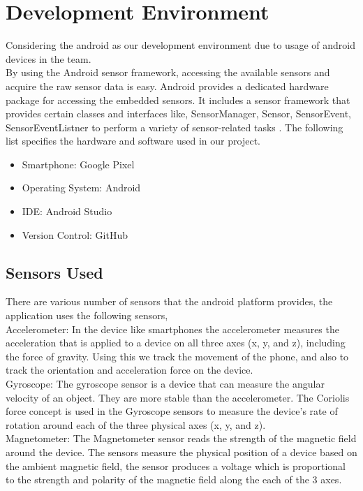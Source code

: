 \documentclass[conference]{IEEEtran}
\begin{document}
\section{Development Environment}
Considering the android as our development environment due to usage of android devices in the team.\\
By using the Android sensor framework, accessing the available sensors and acquire the raw sensor data is easy. Android provides a dedicated hardware package for accessing the embedded sensors. It includes a sensor framework that provides certain classes and interfaces like, SensorManager, Sensor, SensorEvent, SensorEventListner to perform a variety of sensor-related tasks \cite{b1}. The following list specifies the hardware and software used in our project.
\begin{itemize}
    \item Smartphone: Google Pixel
    \item Operating System: Android
    \item IDE: Android Studio
    \item Version Control: GitHub
\end{itemize}

\subsection{Sensors Used}
There are various number of sensors that the android platform provides, the application uses the following sensors,\\
Accelerometer: In the device like smartphones the accelerometer measures the acceleration that is applied to a device on all three axes (x, y, and z), including the force of gravity. Using this we track the movement of the phone, and also to track the orientation and acceleration force on the device. \\
Gyroscope: The gyroscope sensor is a device that can measure the angular velocity of an object. They are more stable than the accelerometer.  The Coriolis force concept is used in the Gyroscope sensors to measure the device's rate of rotation around each of the three physical axes (x, y, and z). \\
Magnetometer: The Magnetometer sensor reads the strength of the magnetic field around the device. The sensors measure the physical position of a device based on the ambient magnetic field, the sensor produces a voltage which is proportional to the strength and polarity of the magnetic field along the each of the 3 axes.
\end{document}

